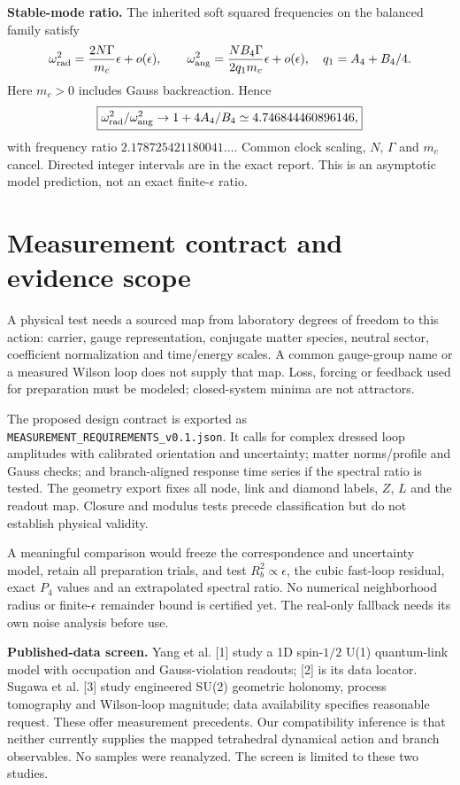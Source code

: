 \documentclass[11pt,a4paper]{article}
\begin{document}
\textbf{Stable-mode ratio.} The inherited soft squared frequencies on the balanced family satisfy
\[
\omega_{\rm rad}^2=\frac{2N\Gamma}{m_c}\epsilon+o(\epsilon),\qquad
\omega_{\rm ang}^2=\frac{NB_4\Gamma}{2q_1m_c}\epsilon+o(\epsilon),\quad q_1=A_4+B_4/4.
\]
Here $m_c>0$ includes Gauss backreaction. Hence
\[
\boxed{\omega_{\rm rad}^2/\omega_{\rm ang}^2\to1+4A_4/B_4\simeq4.746844460896146,}
\]
with frequency ratio $2.178725421180041\ldots$. Common clock scaling, $N$, $\Gamma$ and $m_c$ cancel. Directed integer intervals are in the exact report. This is an asymptotic model prediction, not an exact finite-$\epsilon$ ratio.
\newpage
\section{Measurement contract and evidence scope}
A physical test needs a sourced map from laboratory degrees of freedom to this action: carrier, gauge representation, conjugate matter species, neutral sector, coefficient normalization and time/energy scales. A common gauge-group name or a measured Wilson loop does not supply that map. Loss, forcing or feedback used for preparation must be modeled; closed-system minima are not attractors.

The proposed design contract is exported as \texttt{MEASUREMENT\_REQUIREMENTS\_v0.1.json}. It calls for complex dressed loop amplitudes with calibrated orientation and uncertainty; matter norms/profile and Gauss checks; and branch-aligned response time series if the spectral ratio is tested. The geometry export fixes all node, link and diamond labels, $Z$, $L$ and the readout map. Closure and modulus tests precede classification but do not establish physical validity.

A meaningful comparison would freeze the correspondence and uncertainty model, retain all preparation trials, and test $R_b^2\propto\epsilon$, the cubic fast-loop residual, exact $P_4$ values and an extrapolated spectral ratio. No numerical neighborhood radius or finite-$\epsilon$ remainder bound is certified yet. The real-only fallback needs its own noise analysis before use.

\textbf{Published-data screen.} Yang et al. [1] study a 1D spin-$1/2$ U(1) quantum-link model with occupation and Gauss-violation readouts; [2] is its data locator. Sugawa et al. [3] study engineered SU(2) geometric holonomy, process tomography and Wilson-loop magnitude; data availability specifies reasonable request. These offer measurement precedents. Our compatibility inference is that neither currently supplies the mapped tetrahedral dynamical action and branch observables. No samples were reanalyzed. The screen is limited to these two studies.
\end{document}
